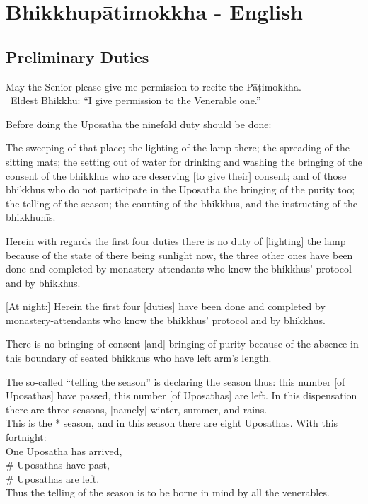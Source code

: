 

\chapter{Bhikkhupātimokkha - English}

\clearpage



\section{Preliminary Duties}
\label{preliminary-duties}

\begin{intro}
	May the Senior please give me permission to recite the Pāṭimokkha.\\
	\anglebracketleft\ \hspace{-0.5mm}Eldest Bhikkhu: ``I give permission to the Venerable one.'' \hspace{-0.5mm}\anglebracketright\
\end{intro}

Before doing the Uposatha the ninefold duty should be done:

The sweeping of that place; the lighting of the lamp there; the spreading of the sitting mats; the setting out of water for drinking and washing the bringing of the consent of the bhikkhus who are deserving [to give their] consent; and of those bhikkhus who do not participate in the Uposatha the bringing of the purity too; the telling of the season; the counting of the bhikkhus, and the instructing of the bhikkhunīs.

Herein with regards the first four duties there is no duty of [lighting] the lamp because of the state of there being sunlight now, the three other ones have been done and completed by monastery-attendants who know the bhikkhus' protocol and by bhikkhus.

	[At night:] Herein the first four [duties] have been done and completed by monastery-attendants who know the bhikkhus’ protocol and by bhikkhus.

There is no bringing of consent [and] bringing of purity because of the absence in this boundary of seated bhikkhus who have left arm's length.

The so-called ``telling the season'' is declaring the season thus: this number [of Uposathas] have passed, this number [of Uposathas] are left. In this dispensation there are three seasons, [namely] winter, summer, and rains.\\
This is the * season, and in this season there are eight Uposathas. With this fortnight:\\
One Uposatha has arrived,\\
\# Uposathas have past,\\
\# Uposathas are left.\\
Thus the telling of the season is to be borne in mind by all the venerables.

